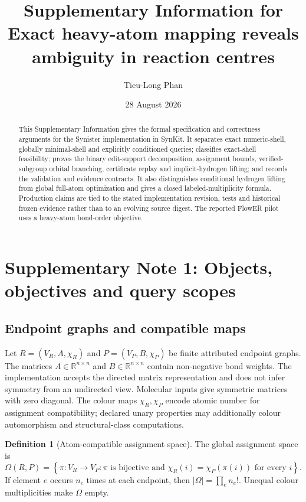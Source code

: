\documentclass[11pt]{article}
\title{\textbf{Supplementary Information for\\
Exact heavy-atom mapping reveals ambiguity in reaction centres}}
\author{Tieu-Long Phan}
\date{28 August 2026}
\theoremstyle{definition}
\newtheorem{definition}[theorem]{Definition}
\newcommand{\R}{\mathbb{R}}
\begin{document}
\maketitle

\begin{abstract}
This Supplementary Information gives the formal specification and correctness
arguments for the Synister implementation in SynKit.  It separates exact
numeric-shell, globally minimal-shell and explicitly conditioned queries;
classifies exact-shell feasibility; proves the binary edit-support
decomposition, assignment bounds, verified-subgroup orbital branching,
certificate replay and implicit-hydrogen lifting; and records the validation
and evidence contracts.  It also distinguishes conditional hydrogen lifting
from global full-atom optimization and gives a closed labeled-multiplicity
formula.  Production claims are tied to the stated implementation revision,
tests and historical frozen evidence rather than to an evolving source digest.
The reported FlowER pilot uses a heavy-atom bond-order objective.
\end{abstract}

\tableofcontents

\section{Supplementary Note 1: Objects, objectives and query scopes}

\subsection{Endpoint graphs and compatible maps}

Let
\(
 R=(V_R,A,\chi_R)
\)
and
\(
 P=(V_P,B,\chi_P)
\)
be finite attributed endpoint graphs.  The matrices
\(A\in\R^{n\times n}\) and \(B\in\R^{n\times n}\) contain non-negative
bond weights.  The implementation accepts the directed matrix representation
and does not infer symmetry from an undirected view.  Molecular inputs give
symmetric matrices with zero diagonal.  The colour maps \(\chi_R,\chi_P\)
encode atomic number for assignment compatibility; declared unary properties
may additionally colour automorphism and structural-class computations.

\begin{definition}[Atom-compatible assignment space]
The global assignment space is
\[
 \Omega(R,P)=\left\{\pi:V_R\to V_P:
   \pi\text{ is bijective and }
   \chi_R(i)=\chi_P(\pi(i))\text{ for every }i\right\}.
\]
If element \(e\) occurs \(n_e\) times at each endpoint, then
\(|\Omega|=\prod_e n_e!\).  Unequal colour multiplicities make \(\Omega\)
empty.
\end{definition}
\end{document}
